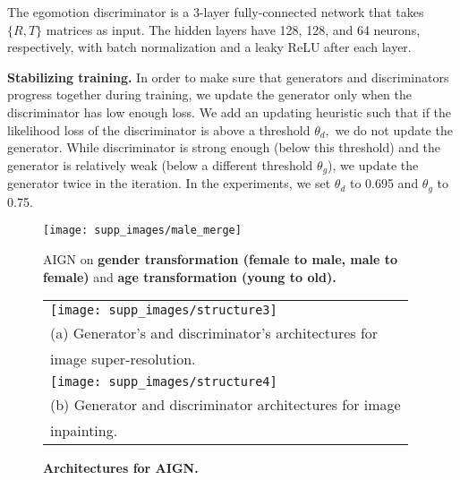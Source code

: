 \documentclass[10pt,twocolumn,letterpaper]{article}
\newcommand\todo[1]{\textcolor{red}{#1}}
\begin{document}
The egomotion discriminator is a 3-layer fully-connected network that takes $\{R,T\}$ matrices as input. The hidden layers have 128, 128, and 64 neurons, respectively, with batch normalization and a leaky ReLU after each layer.

\textbf{Stabilizing training.} 
In order to  make sure that generators and discriminators progress together during training, we update the generator  only when the discriminator has low enough loss. We add an updating heuristic such that if the likelihood loss of the discriminator is above a threshold $\theta_d,$ we do not update the generator. While discriminator is strong enough (below this threshold) and the generator is relatively weak (below a different threshold $\theta_g$), we update the generator twice %
in the iteration. 
In the experiments, we set $\theta_d$ to 0.695 and $\theta_g$ to 0.75.



\begin{figure*}[t]
    \centering
    \texttt{[image: supp\_images/male\_merge]}
     \centering
    \caption{AIGN on \textbf{gender transformation (female to male, male to female)} and \textbf{age transformation (young to old).}}
    \label{fig:more-male-merge}
\end{figure*}

\begin{figure}[t]
    \begin{tabular}{l}
    \texttt{[image: supp\_images/structure3]} \\
    (a) Generator's and discriminator's architectures for  \\image super-resolution. \\
    \texttt{[image: supp\_images/structure4]} \\
    (b) Generator and discriminator architectures for image  \\inpainting. \\
    \end{tabular}
\centering
    \caption{\textbf{Architectures for AIGN.}}
    \label{fig:architectures}
\end{figure}
\end{document}

